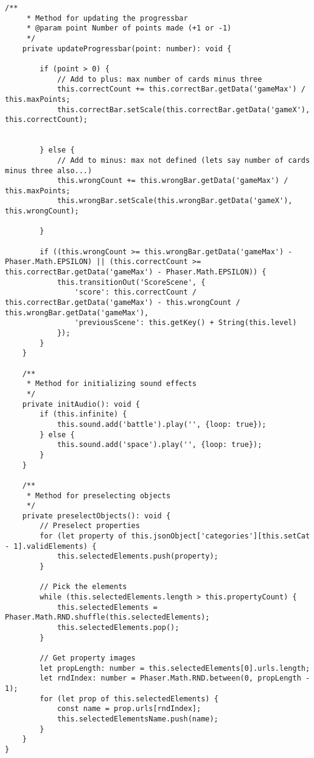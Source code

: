 \begin{lstlisting}[style=TypeScript, caption={propertySortingScene.ts}]
    /**
     * Method for updating the progressbar
     * @param point Number of points made (+1 or -1)
     */
    private updateProgressbar(point: number): void {

        if (point > 0) {
            // Add to plus: max number of cards minus three
            this.correctCount += this.correctBar.getData('gameMax') / this.maxPoints;
            this.correctBar.setScale(this.correctBar.getData('gameX'), this.correctCount);


        } else {
            // Add to minus: max not defined (lets say number of cards minus three also...)
            this.wrongCount += this.wrongBar.getData('gameMax') / this.maxPoints;
            this.wrongBar.setScale(this.wrongBar.getData('gameX'), this.wrongCount);

        }

        if ((this.wrongCount >= this.wrongBar.getData('gameMax') - Phaser.Math.EPSILON) || (this.correctCount >= this.correctBar.getData('gameMax') - Phaser.Math.EPSILON)) {
            this.transitionOut('ScoreScene', {
                'score': this.correctCount / this.correctBar.getData('gameMax') - this.wrongCount / this.wrongBar.getData('gameMax'),
                'previousScene': this.getKey() + String(this.level)
            });
        }
    }

    /**
     * Method for initializing sound effects
     */
    private initAudio(): void {
        if (this.infinite) {
            this.sound.add('battle').play('', {loop: true});
        } else {
            this.sound.add('space').play('', {loop: true});
        }
    }

    /**
     * Method for preselecting objects
     */
    private preselectObjects(): void {
        // Preselect properties
        for (let property of this.jsonObject['categories'][this.setCat - 1].validElements) {
            this.selectedElements.push(property);
        }

        // Pick the elements
        while (this.selectedElements.length > this.propertyCount) {
            this.selectedElements = Phaser.Math.RND.shuffle(this.selectedElements);
            this.selectedElements.pop();
        }

        // Get property images
        let propLength: number = this.selectedElements[0].urls.length;
        let rndIndex: number = Phaser.Math.RND.between(0, propLength - 1);
        for (let prop of this.selectedElements) {
            const name = prop.urls[rndIndex];
            this.selectedElementsName.push(name);
        }
    }
}
\end{lstlisting}


